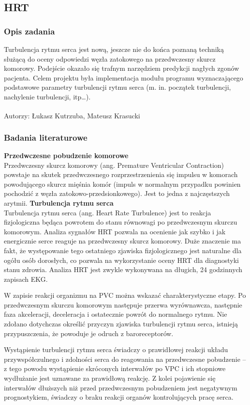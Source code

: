 \documentclass[a4paper, 11pt]{article}
\begin{document}
\subsection{HRT}
\label{sec:hrt}

\subsubsection{Opis zadania}
\label{sec:hrt:desc}

Turbulencja rytmu serca jest nową, jeszcze nie do końca poznaną techniką służącą do oceny odpowiedzi węzła zatokowego na przedwczesny skurcz komorowy. Podejście okazało się trafnym narzędziem predykcji nagłych zgonów pacjenta.
Celem projektu była implementacja modułu programu wyznaczającego podstawowe parametry turbulencji rytmu serca (m. in. początek turbulencji, nachylenie turbulencji, itp…).
\\
\\
Autorzy: Łukasz Kutrzuba, Mateusz Krasucki
\\
\subsubsection{Badania literaturowe}
\label{sec:hrt:papers}

\textbf{Przedwczesne pobudzenie komorowe}\\
Przedwczesny skurcz komorowy (ang. Premature Ventricular
Contraction) powstaje na skutek przedwczesnego rozprzestrzenienia się
impulsu w komorach powodującego skurcz mięśnia komór (impuls w
normalnym przypadku powinien pochodzić z węzła zatokowo-przedsionkowego).
Jest to jedna z najczęstszych arytmii.
\textbf{Turbulencja rytmu serca}\\
Turbulencja rytmu serca (ang. Heart Rate Turbulence) jest to reakcja fizjologiczna będąca powrotem do stanu równowagi po przedwczesnym skurczu
komorowym. Analiza sygnałów HRT pozwala na ocenienie jak
szybko i jak energicznie serce reaguje na przedwczesny skurcz
komorowy. Duże znaczenie ma fakt, że występowanie tego
ostatniego zjawiska fizjologicznego jest naturalne dla ogółu osób
dorosłych, co pozwala na wykorzystanie oceny HRT dla
diagnostyki stanu zdrowia. Analiza HRT jest zwykle wykonywana
na długich, 24 godzinnych zapisach EKG.
\par W zapisie reakcji organizmu na PVC można wskazać charakterystyczne etapy. Po przedwczesnym skurczu komorowym następuje przerwa wyrównawcza, następnie faza akceleracji, deceleracja i ostatecznie powrót do normalnego rytmu.
Nie zdołano dotychczas określić przyczyn zjawiska turbulencji rytmu serca, istnieją przypuszczenia, że powoduje je odruch z baroreceptorów.
\par Wystąpienie turbulencji rytmu serca świadczy o prawidłowej reakcji 
układu przywspółczulnego i zdolności serca do reagowania na przedwczesne pobudzenie -- z tego powodu wystąpienie skróconych interwałów po VPC i ich stopniowe wydłużanie jest uznawane za prawidłową reakcję. Z kolei pojawienie się interwałów dłuższych niż przed 
przedwczesnym pobudzeniem jest negatywnym prognostykiem, świadczy o braku
reakcji organów kontrolujących pracę serca.
\end{document}
